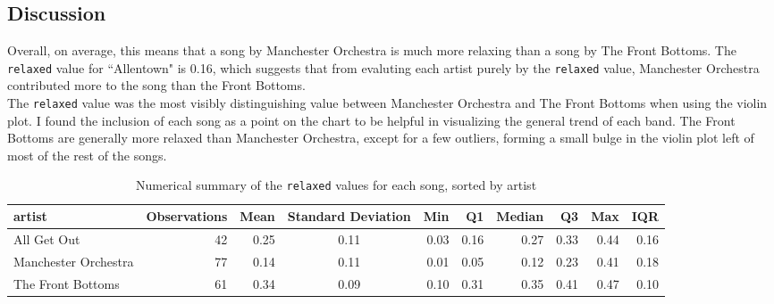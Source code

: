 \documentclass{article}\usepackage[]{graphicx}\usepackage[]{xcolor}
\begin{document}
\begin{multicols}{2}
\section{Discussion}
\indent Overall, on average, this means that a song by Manchester Orchestra is much more relaxing than a song by The Front Bottoms. The \texttt{relaxed} value for ``Allentown" is 0.16, which suggests that from evaluting each artist purely by the \texttt{relaxed} value, Manchester Orchestra contributed more to the song than the Front Bottoms. \\
\indent The \texttt{relaxed} value was the most visibly distinguishing value between Manchester Orchestra and The Front Bottoms when using the violin plot. I found the inclusion of each song as a point on the chart to be helpful in visualizing the general trend of each band. The Front Bottoms are generally more relaxed than Manchester Orchestra, except for a few outliers, forming a small bulge in the violin plot left of most of the rest of the songs.

\vspace{2em}

\begin{tiny}

\end{tiny}
\end{multicols}

\newpage
\onecolumn
\begin{table}[ht]
\centering
\begin{tabular}{lrrcrrrrrr}
  \hline
artist & Observations & Mean & Standard Deviation & Min & Q1 & Median & Q3 & Max & IQR \\ 
  \hline \hline
All Get Out & 42 & 0.25 & 0.11 & 0.03 & 0.16 & 0.27 & 0.33 & 0.44 & 0.16 \\ 
  Manchester Orchestra & 77 & 0.14 & 0.11 & 0.01 & 0.05 & 0.12 & 0.23 & 0.41 & 0.18 \\ 
  The Front Bottoms & 61 & 0.34 & 0.09 & 0.10 & 0.31 & 0.35 & 0.41 & 0.47 & 0.10 \\ 
   \hline
\end{tabular}
\caption{Numerical summary of the \texttt{relaxed} values for each song, sorted by artist} 
\label{num.sum}
\end{table}
\end{document}
